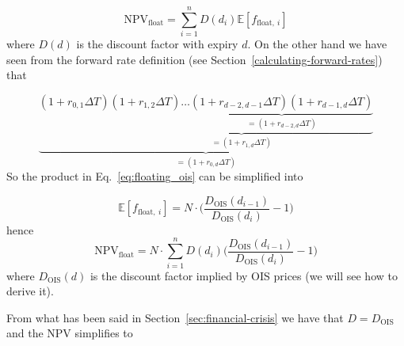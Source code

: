 \begin{equation}
\mathrm{NPV}_{\mathrm{float}} = \sum_{i=1}^{n}D(d_i)\mathbb{E}[f_{\mathrm{float},~i}]
\end{equation}
where \(D(d)\) is the discount factor with expiry \(d\). On the other
hand we have seen from the forward rate definition (see Section~\ref{calculating-forward-rates}) that

\begin{equation*}
\underbrace{(1+r_{0,1}\Delta T)\underbrace{(1+r_{1,2}\Delta T)\ldots\underbrace{(1+r_{d-2,d-1}\Delta T)(1+r_{d-1,d}\Delta T)}_{=(1+r_{d-2,d}\Delta T)}}_{=(1+r_{1,d}\Delta T)}}_{=(1+r_{0,d}\Delta T)}
\end{equation*}
So the product in Eq.~\ref{eq:floating_ois} can be simplified into

\begin{equation}
\mathbb{E}[f_{\mathrm{float},~i}] = N\cdot\Big(\frac{D_{\mathrm{OIS}}(d_{i-1})}{D_{\mathrm{OIS}}(d_{i})} - 1\Big)
\end{equation}
hence
\begin{equation}
\mathrm{NPV}_{\mathrm{float}} = N\cdot \sum_{i=1}^{n}D(d_i) \Big(\frac{D_{\mathrm{OIS}}(d_{i-1})}{D_{\mathrm{OIS}}(d_{i})} - 1\Big)
\end{equation}
where \(D_{\mathrm{OIS}}(d)\) is the discount factor implied by OIS
prices (we will see how to derive it).

%

From what has been said in Section~\ref{sec:financial-crisis} we have that 
\(D = D_{\mathrm{OIS}}\) and the NPV simplifies to

